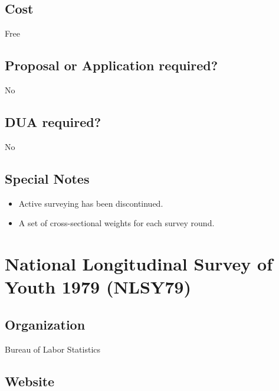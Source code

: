 \documentclass[
]{book}
\providecommand{\tightlist}{%
  \setlength{\itemsep}{0pt}\setlength{\parskip}{0pt}}
\begin{document}
\hypertarget{cost-56}{%
\section{Cost}\label{cost-56}}

Free

\hypertarget{proposal-or-application-required-56}{%
\section{Proposal or Application required?}\label{proposal-or-application-required-56}}

No

\hypertarget{dua-required-56}{%
\section{DUA required?}\label{dua-required-56}}

No

\hypertarget{special-notes-56}{%
\section{Special Notes}\label{special-notes-56}}

\begin{itemize}
\tightlist
\item
  Active surveying has been discontinued.
\item
  A set of cross-sectional weights for each survey round.
\end{itemize}

\mainmatter

\hypertarget{national-longitudinal-survey-of-youth-1979-nlsy79}{%
\chapter{National Longitudinal Survey of Youth 1979 (NLSY79)}\label{national-longitudinal-survey-of-youth-1979-nlsy79}}

\hypertarget{organization-57}{%
\section{Organization}\label{organization-57}}

Bureau of Labor Statistics

\hypertarget{website-57}{%
\section{Website}\label{website-57}}
\end{document}
